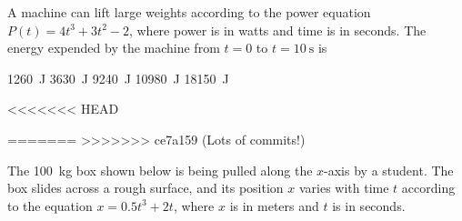 \documentclass{../../oss-apphys-exam}
\newcounter{lastmc}
\begin{document}
\begin{multicols*}{2}
\begin{multicols*}{2}
\begin{questions}
    \question A machine can lift large weights according to the power equation
    $P(t)=4t^3+3t^2-2$, where power is in watts and time is in seconds. The
    energy expended by the machine from $t=0$ to $t=\SI{10}{\second}$ is
    \begin{choices}
      \choice \SI{1260}{\joule}
      \choice \SI{3630}{\joule}
      \choice \SI{9240}{\joule}
      \choice \SI{10980}{\joule}
      \choice \SI{18150}{\joule}
    \end{choices}
  \end{questions}
  \setcounter{lastmc}{\value{question}}
\end{multicols*}
\newpage

<<<<<<< HEAD

=======
>>>>>>> ce7a159 (Lots of commits!)

\begin{questions}
  \setcounter{question}{\value{lastmc}}

  \question The \SI{100}{\kilo\gram} box shown below is being pulled along the
  $x$-axis by a student. The box slides across a rough surface, and its
  position $x$ varies with time $t$ according to the equation
  $x= 0.5t^3+2t$, where $x$ is in meters and $t$ is in seconds.
\end{questions}
\end{multicols*}
\end{document}
